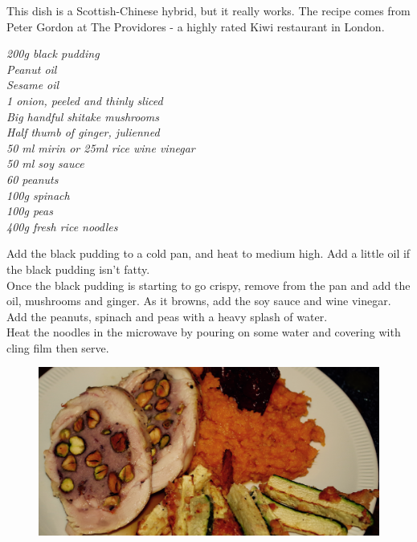 \documentclass{tufte-book}
\begin{document}
This dish is a Scottish-Chinese hybrid, but it really works. The recipe comes from Peter Gordon at The Providores - a highly rated Kiwi restaurant in London.

\smallskip
\emph{200g black pudding
\\Peanut oil
\\Sesame oil
\\1 onion, peeled and thinly sliced
\\Big handful shitake mushrooms
\\Half thumb of ginger, julienned
\\50 ml mirin or 25ml rice wine vinegar
\\50 ml soy sauce
\\60 peanuts
\\100g spinach
\\100g peas
\\400g fresh rice noodles
}

\smallskip
Add the black pudding to a cold pan, and heat to medium high. Add a little oil if the black pudding isn't fatty. 
\\Once the black pudding is starting to go crispy, remove from the pan and add the oil, mushrooms and ginger. As it browns, add the soy sauce and wine vinegar.
\\Add the peanuts, spinach and peas with a heavy splash of water.
\\Heat the noodles in the microwave by pouring on some water and covering with cling film then serve.

\newpage

\begin{figure}[h]
  \includegraphics[width=\linewidth]{chickenstuffed.png}
\end{figure}
\end{document}
